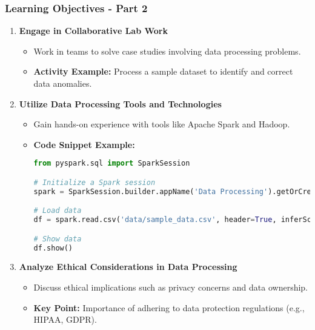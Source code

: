 \documentclass[aspectratio=169]{beamer}
\begin{document}
\begin{frame}[fragile]
    \frametitle{Learning Objectives - Part 2}
    \begin{enumerate}[resume]
        \item \textbf{Engage in Collaborative Lab Work}
        \begin{itemize}
            \item Work in teams to solve case studies involving data processing problems.
            \item \textbf{Activity Example:} Process a sample dataset to identify and correct data anomalies.
        \end{itemize}

        \item \textbf{Utilize Data Processing Tools and Technologies}
        \begin{itemize}
            \item Gain hands-on experience with tools like Apache Spark and Hadoop.
            \item \textbf{Code Snippet Example:}
            \begin{lstlisting}[language=Python]
from pyspark.sql import SparkSession

# Initialize a Spark session
spark = SparkSession.builder.appName('Data Processing').getOrCreate()

# Load data
df = spark.read.csv('data/sample_data.csv', header=True, inferSchema=True)

# Show data
df.show()
            \end{lstlisting}
        \end{itemize}
        
        \item \textbf{Analyze Ethical Considerations in Data Processing}
        \begin{itemize}
            \item Discuss ethical implications such as privacy concerns and data ownership.
            \item \textbf{Key Point:} Importance of adhering to data protection regulations (e.g., HIPAA, GDPR).
        \end{itemize}
    \end{enumerate}
\end{frame}
\end{document}
